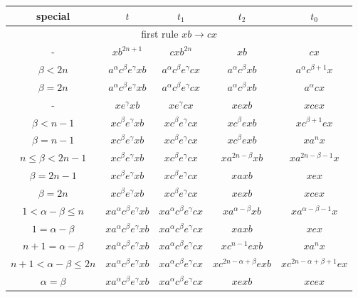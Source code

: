\documentclass{article}
\theoremstyle{definition}
\begin{document}
\begin{center}
\begin{tabular}{|c|c|c|c|c|}
\hline
special & $t$ & $t_1$ & $t_2$ & $t_0$ \\
\hline
\hline
\multicolumn{5}{|c|}{first rule $xb \rightarrow cx$}\\
\hline
\hline
- & $xb^{2n+1}$ & $cxb^{2n}$ & $xb$ & $cx$ \\
\hline
$\beta<2n$ & $   a^\alpha c^\beta e^\gamma x b  $ &  $  a^\alpha c^\beta e^\gamma c x  $ &   $  a^\alpha c^\beta x b  $ &  $ a^\alpha c^{\beta+1} x  $ \\
\hline
$\beta=2n$ & $   a^\alpha c^\beta e^\gamma x b  $ &  $  a^\alpha c^\beta e^\gamma c x  $ &   $  a^\alpha c^\beta x b  $ &  $ a^\alpha c x  $ \\
\hline
- & $x e^{\gamma} x b  $ &  $  x e^{\gamma} c x  $ &   $   x e x b  $ &  $ x c e x    $ \\
\hline
$\beta<n-1$ & $x c^\beta e^\gamma x b$ &   $x c^\beta e^\gamma c x$    &   $xc^\beta e x b$  &   $ xc^{\beta+1} e x$\\
\hline
$\beta=n-1$ & $x c^\beta e^\gamma x b$ &   $x c^\beta e^\gamma c x$    &   $xc^\beta e x b$  &   $ x a^n x$\\
\hline
$n\le \beta <2n-1$ & $x c^\beta e^\gamma x b$ &   $x c^\beta e^\gamma c x$    &   $x a^{2n-\beta} x b$  &   $ x a^{2n-\beta-1} x$\\
\hline
$\beta = 2n-1$ & $x c^\beta e^\gamma x b$ &   $x c^\beta e^\gamma c x$    &   $x a x b$  &   $ x e x$\\
\hline
$\beta = 2n$ &  $x c^\beta e^\gamma x b$ &   $x c^\beta e^\gamma c x$    &   $x e x b$  &   $ x c e x$\\
\hline
$1< \alpha-\beta \le n$ & $ x a^\alpha c^\beta e^\gamma x b$ & $ x a^\alpha c^\beta e^\gamma c x $ & $ x a^{\alpha-\beta} x b $ &  $ x a^{\alpha-\beta -1} x $\\
\hline
$1 = \alpha-\beta $ & $ x a^\alpha c^\beta e^\gamma x b$ & $ x a^\alpha c^\beta e^\gamma c x $ & $ x a x b $ &  $ x e x $\\
\hline
$n+1 = \alpha-\beta$ & $ x a^\alpha c^\beta e^\gamma x b$ & $ x a^\alpha c^\beta e^\gamma c x $ & $ x c^{n-1} e x b $ &  $ x a^n x $\\
\hline
$n+1 < \alpha-\beta \le 2n$ & $ x a^\alpha c^\beta e^\gamma x b$ & $ x a^\alpha c^\beta e^\gamma c x $ & $ x c^{2n-\alpha+\beta} e x b $ &  $ x c^{2n-\alpha+\beta+1} e x $\\
\hline
$\alpha = \beta$ & $ x a^\alpha c^\beta e^\gamma x b$ & $ x a^\alpha c^\beta e^\gamma c x $ & $ x e x b $ &  $ x c e x $\\

\end{tabular}
\end{center}
\end{document}
